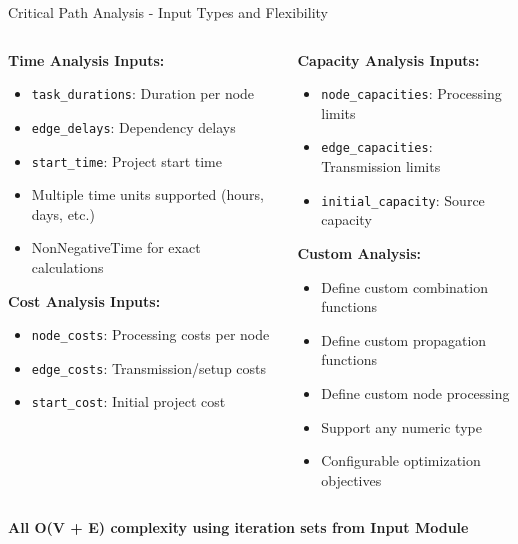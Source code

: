 \documentclass[aspectratio=169]{beamer}
\begin{document}
\begin{frame}{\textcolor{juliablue}{Critical Path Analysis - Input Types and Flexibility}}

\begin{columns}
\begin{column}{0.48\textwidth}
\textbf{\textcolor{juliagreen}{Time Analysis Inputs:}}
\begin{itemize}
\item \texttt{task\_durations}: Duration per node
\item \texttt{edge\_delays}: Dependency delays
\item \texttt{start\_time}: Project start time
\item Multiple time units supported (hours, days, etc.)
\item NonNegativeTime for exact calculations
\end{itemize}

\vspace{0.3cm}
\textbf{\textcolor{juliablue}{Cost Analysis Inputs:}}
\begin{itemize}
\item \texttt{node\_costs}: Processing costs per node
\item \texttt{edge\_costs}: Transmission/setup costs
\item \texttt{start\_cost}: Initial project cost
\end{itemize}
\end{column}

\begin{column}{0.48\textwidth}
\textbf{\textcolor{juliared}{Capacity Analysis Inputs:}}
\begin{itemize}
\item \texttt{node\_capacities}: Processing limits
\item \texttt{edge\_capacities}: Transmission limits
\item \texttt{initial\_capacity}: Source capacity
\end{itemize}

\vspace{0.3cm}
\textbf{\textcolor{juliapurple}{Custom Analysis:}}
\begin{itemize}
\item Define custom combination functions
\item Define custom propagation functions
\item Define custom node processing
\item Support any numeric type
\item Configurable optimization objectives
\end{itemize}
\end{column}
\end{columns}

\vspace{0.3cm}
\begin{center}
\textbf{All \textcolor{juliagreen}{O(V + E)} complexity using iteration sets from Input Module}
\end{center}
\end{frame}
\end{document}

